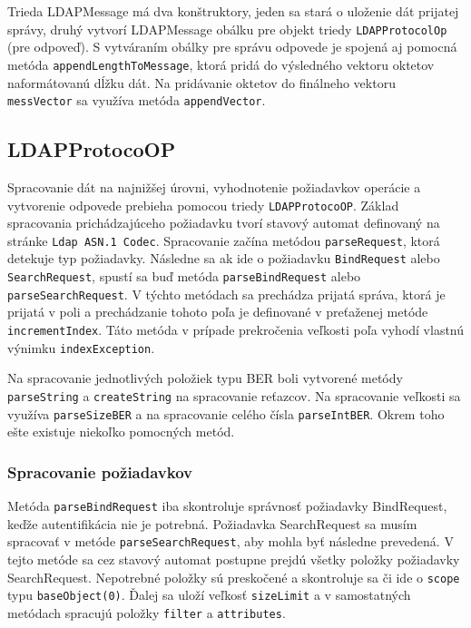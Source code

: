 \documentclass[11pt,a4paper]{article}
\begin{document}
Trieda LDAPMessage má dva konštruktory, jeden sa stará o uloženie dát prijatej správy, druhý vytvorí LDAPMessage obálku pre objekt triedy \texttt{LDAPProtocolOp} (pre odpoveď). S vytváraním obálky pre správu odpovede je spojená aj pomocná metóda \texttt{appendLengthToMessage}, ktorá pridá do výsledného vektoru oktetov naformátovanú dĺžku dát. Na pridávanie oktetov do finálneho vektoru \texttt{messVector} sa využíva metóda \texttt{appendVector}. 

\subsection{LDAPProtocoOP}
Spracovanie dát na najnižšej úrovni, vyhodnotenie požiadavkov operácie a vytvorenie odpovede prebieha pomocou triedy \texttt{LDAPProtocoOP}. Základ spracovania prichádzajúceho požiadavku tvorí stavový automat definovaný na stránke \texttt{Ldap ASN.1 Codec}\cite{ANS1}. Spracovanie začína metódou \texttt{parseRequest}, ktorá detekuje typ požiadavky. Následne sa ak ide o požiadavku \texttt{BindRequest} alebo \texttt{SearchRequest}, spustí sa buď metóda \texttt{parseBindRequest} alebo \texttt{parseSearchRequest}. V týchto metódach sa prechádza prijatá správa, ktorá je prijatá v poli a prechádzanie tohoto poľa je definované v preťaženej metóde \texttt{incrementIndex}. Táto metóda v prípade prekročenia veľkosti poľa vyhodí vlastnú výnimku \texttt{indexException}.

Na spracovanie jednotlivých položiek typu BER boli vytvorené metódy \texttt{parseString} a \texttt{createString} na spracovanie reťazcov. Na spracovanie veľkosti sa využíva \texttt{parseSizeBER} a na spracovanie celého čísla \texttt{parseIntBER}. Okrem toho ešte existuje niekoľko pomocných metód.

\subsubsection{Spracovanie požiadavkov}
Metóda \texttt{parseBindRequest} iba skontroluje správnosť požiadavky BindRequest, keďže autentifikácia nie je potrebná. Požiadavka SearchRequest sa musím spracovať v metóde \texttt{parseSearchRequest}, aby mohla byť následne prevedená. V tejto metóde sa cez stavový automat postupne prejdú všetky položky požiadavky SearchRequest. Nepotrebné položky sú preskočené a skontroluje sa či ide o \texttt{scope} typu \texttt{baseObject(0)}. Ďalej sa uloží veľkosť \texttt{sizeLimit} a v samostatných metódach spracujú položky \texttt{filter} a \texttt{attributes}. 
\end{document}
